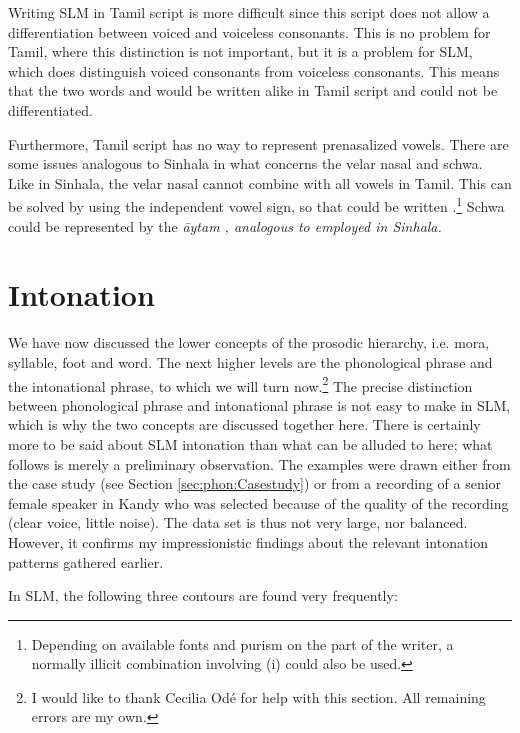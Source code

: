 Writing SLM in Tamil script is more difficult since this script does not allow a differentiation between voiced and voiceless consonants. This is no problem for Tamil, where this distinction is not important, but it is a problem for SLM, which does distinguish voiced consonants from voiceless consonants. This means that the two words   and  would be written alike in Tamil script \graphem{{\btam \TAMkaa\TAMka\etam }} and could not be differentiated.

Furthermore, Tamil script has no way to represent prenasalized vowels. There are some issues analogous to Sinhala in what concerns the velar nasal and schwa. Like in Sinhala, the velar nasal cannot combine with all vowels in Tamil. This can be solved by using the independent vowel sign, so that  could be written \graphem{{\btam \TAMaa\TAMng\TAMi\TAMng\etam }}.\footnote{Depending on available fonts and purism on the part of the writer, a normally illicit combination involving \graphem{{\btam \TAMngi\etam }} (\ng i) could also be used.} Schwa could be represented by the \em \=aytam \em \graphem{$\therefore$}, analogous to \graphem{\visarga{}} employed in Sinhala.

\section{Intonation}\label{sec:phon:Intonation}
\glossINTmode

We have now discussed the lower concepts of the prosodic hierarchy, i.e. mora, syllable, foot and word. The next higher levels are the phonological phrase and the intonational phrase, to which we will turn now.\footnote{I would like to thank Cecilia Od\'e for help with this section. All remaining errors are my own.} The precise distinction between phonological phrase and intonational phrase is not easy to make in SLM, which is why the two concepts are discussed together here. There is certainly more to be said about SLM intonation than what can be alluded to here; what follows is merely a preliminary observation. The examples were drawn either from the case study (see Section \ref{sec:phon:Casestudy}) or from a recording of a senior female speaker in Kandy who was selected because of the quality of the recording (clear voice, little noise). The data set is thus not very large, nor balanced. However, it confirms my impressionistic findings about the relevant intonation patterns gathered earlier.

In SLM, the following three contours are found very frequently:

